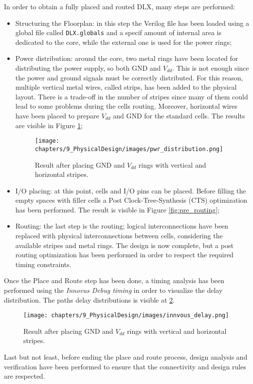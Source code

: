 In order to obtain a fully placed and routed DLX, many steps are performed:
\begin{itemize}
    \item Structuring the Floorplan: in this step the Verilog file has been loaded using a global file called \texttt{DLX.globals} and a specif amount of internal area is dedicated to the core, while the external one is used for the power rings;
    \item Power distribution: around the core, two metal rings have been located for distributing the power supply, so both GND and $V_{dd}$. This is not enough since the power and ground signals must be correctly distributed. For this reason, multiple vertical metal wires, called strips, has been added to the physical layout. There is a trade-off in the number of stripes since many of them could lead to some problems during the cells routing. Moreover, horizontal wires have been placed to prepare $V_{dd}$ and GND for the standard cells. The results are visible in Figure \ref{stripes};
    \begin{figure}[h]   
        \centering
        \texttt{[image: chapters/9\_PhysicalDesign/images/pwr\_distribution.png]}
        \caption{Result after placing GND and $V_{dd}$ rings with vertical and horizontal stripes.}
        \label{stripes}
    \end{figure}
    
    \item I/O placing: at this point, cells and I/O pins can be placed. Before filling the empty spaces with filler cells a Post Clock-Tree-Synthesis (CTS) optimization has been performed. The result is visible in Figure \ref{fig:pre_routing};
    \item Routing: the last step is the routing; logical interconnections have been replaced with physical interconnections between cells, considering the available stripes and metal rings. The design is now complete, but a post routing optimization has been performed in order to respect the required timing constraints.
\end{itemize}

Once the Place and Route step has been done, a timing analysis has been performed using the \textit{Innovus Debug timing} in order to visualize the delay distribution. The paths delay distributions is visible at \ref{fig:innovus_delay}.
\begin{figure}[h]   
    \centering
    \texttt{[image: chapters/9\_PhysicalDesign/images/innvous\_delay.png]}
    \caption{Result after placing GND and $V_{dd}$ rings with vertical and horizontal stripes.}
    \label{fig:innovus_delay}
\end{figure}

Last but not least, before ending the place and route process, design analysis and verification have been performed to ensure that the connectivity and design rules are respected.